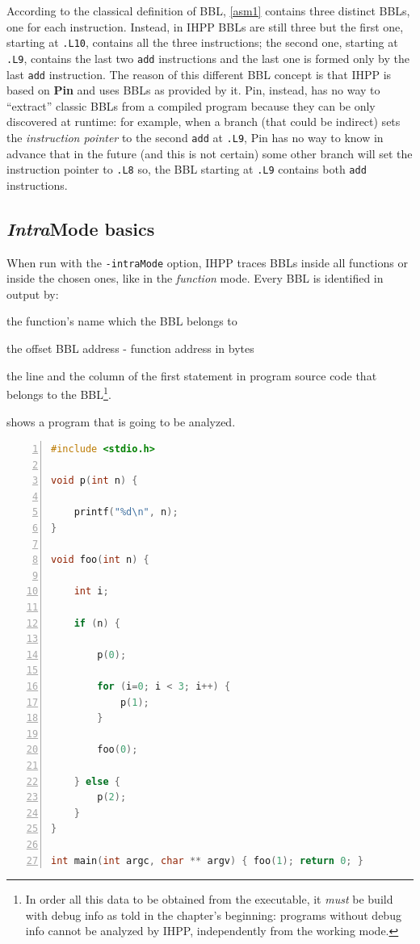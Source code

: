 \documentclass[a4paper,10pt]{report}
\begin{document}
\noindent
According to the classical definition of BBL, \cref{asm1} contains three distinct BBLs, one for each instruction. Instead, in IHPP BBLs are still three but the first one, starting at \verb|.L10|, contains all the three instructions; the second one, starting at \verb|.L9|, contains the last two \verb|add| instructions and the last one is formed only by the 
last \verb|add| instruction. The reason of this different BBL concept is that 
IHPP is based on \textbf{Pin} and uses BBLs as provided by it. 
Pin, instead, has no way to ``extract'' classic BBLs from a compiled program because 
they can be only discovered at runtime: for example, when a branch (that could be indirect) sets the \emph{instruction pointer} to the second \verb|add| at \verb|.L9|, 
Pin has no way to know in advance that in the future (and this is not certain) some 
other branch will set the instruction pointer to \verb|.L8| so, the BBL starting at \verb|.L9| contains both \verb|add| instructions.

\subsection{\emph{Intra}Mode basics}

When run with the \verb|-intraMode| option, IHPP traces BBLs inside all functions or inside the chosen ones, like in the \emph{function} mode. Every BBL is identified in output by: 
\begin{itemize*}
\item the function's name which the BBL belongs to
\item the offset BBL address - function address in bytes
\item the line and the column of the first 
statement in program source code that belongs to the BBL\footnote{In order all this data to be obtained from the executable, it \emph{must} be build 
with debug info as told in the chapter's beginning: programs without debug info 
cannot be analyzed by IHPP, independently from the working mode.}.
\end{itemize*}

\noindent
{} shows a program that is going to be analyzed.

\begin{lstlisting}[language=C, 
	caption={prog4.c, another simple program}, label=prog4, frame=leftline, numbers=left]
#include <stdio.h>

void p(int n) { 
	
	printf("%d\n", n); 
}

void foo(int n) {

	int i;

	if (n) {

		p(0);

		for (i=0; i < 3; i++) {
			p(1);
		}

		foo(0);

	} else {
		p(2);
	}
}

int main(int argc, char ** argv) { foo(1); return 0; }
\end{lstlisting}
\end{document}
